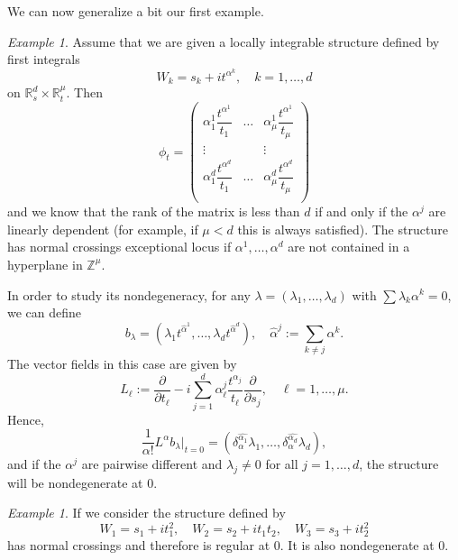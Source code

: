 \documentclass[11pt]{amsart}
\newcommand{\R}{\mathbb{R}}
\newcommand{\dop}[1]{\frac{\partial}{\partial #1}}
\theoremstyle{definition}
\theoremstyle{remark}
\newtheorem{exa}[defn]{Example}
\theoremstyle{plain}
\begin{document}
We can now generalize a bit our first example. 

\begin{exa}
  Assume that we are given a locally integrable structure defined by first integrals
  \[ W_k = s_k + i t^{\alpha^k} , \quad k = 1,\dots, d  \]
  on $\R^d_s \times \R^{\mu}_t$.
  Then
  \[ \phi_t =
    \begin{pmatrix}
      \alpha^1_1 \dfrac{t^{\alpha^1}}{t_1} & \dots  & \alpha^1_\mu \dfrac{t^{\alpha^1}}{t_\mu}  \\
      \vdots & & \vdots \\
      \alpha^d_1 \dfrac{t^{\alpha^d}}{t_1}  & \dots  & \alpha^d_\mu \dfrac{t^{\alpha^d}}{t_\mu}  \\
    \end{pmatrix}  
  \]
and we know that the rank of the matrix is less than $d$ if and only if
the $\alpha^j$ are linearly dependent (for example, if $\mu < d$ this is always satisfied). The structure has normal crossings exceptional locus if
$\alpha^1 , \dots, \alpha^d$ are not contained in a hyperplane in $\mathbb{Z}^\mu$.

In order to study its nondegeneracy, for any $\lambda = (\lambda_1 , \dots, \lambda_d)$
with $\sum \lambda_k \alpha^k =0$, we can define
\[b_\lambda = \left( \lambda_1 t^{\hat \alpha^1} , \dots , \lambda_d t^{\hat \alpha^d}\right), \quad \hat \alpha^j:= \sum_{k\neq j} \alpha^k.  \]
The vector fields in this case are given by
\[ L_\ell := \dop{t_\ell} - i \sum_{j=1}^d \alpha^j_\ell \frac{t^{\alpha_j}}{t_\ell} \dop{s_j}, \quad \ell = 1,\dots, \mu.  \]
Hence,
\[ \frac{1}{\alpha!} L^\alpha b_\lambda|_{t=0} = (\delta_\alpha^{\hat{\alpha_1}} \lambda_1 , \dots, \delta_\alpha^{\hat{\alpha_d}} \lambda_d), \]
and if the $\alpha^j$ are pairwise different and $\lambda_j \neq 0$ for all $j=1,\dots, d$, the structure will be nondegenerate at $0$. 

\end{exa}

\begin{exa}
  If we consider the structure defined by
  \[ W_1 = s_1 + i t_1^2 , \quad W_2 = s_2 + i t_1 t_2 , \quad W_3 = s_3 + i t_2^2  \]
  has normal crossings and therefore is regular at $0$. It is also nondegenerate at $0$.  
\end{exa}
\end{document}
